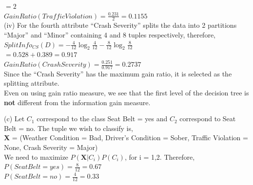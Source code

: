 \documentclass[10pt]{article}
\begin{document}
\begin{flushleft}
\hspace{9.6em} $ = 2$\\
\vspace{0.5em}
\hspace{2em} $GainRatio(Traffic Violation) = \frac{0.231}{2} = 0.1155$\\
\vspace{1em}
(iv) For the fourth attribute ``Crash Severity'' splits the data into 2 partitions ``Major'' and ``Minor'' containing 4 and 8 tuples respectively, therefore, \\
\vspace{0.5em}
\hspace{2em} $SplitInfo_{CS}(D) = - \frac{4}{12} \log_2 \frac{4}{12} - \frac{8}{12} \log_2 \frac{8}{12}$\\
\vspace{0.5em}
\hspace{9.6em} $ = 0.528 + 0.389 = 0.917$\\
\vspace{0.5em}
\hspace{2em} $GainRatio(Crash Severity) = \frac{0.251}{0.917} = 0.2737$\\
\vspace{1em}
Since the ``Crash Severity'' has the maximum gain ratio, it is selected as the splitting attribute.\\
\vspace{0.5em}
Even on using gain ratio measure, we see that the first level of the decision tree is \textbf{not} different from the information gain measure.\\
\end{flushleft}
\vspace{0.5em}
(c) Let $C_{1}$ correspond to the class Seat Belt = yes and $C_{2}$ correspond to Seat Belt = no. The tuple we wish to classify is,\\
\textbf{X} = (Weather Condition = Bad, Driver's Condition = Sober, Traffic Violation = None, Crash Severity = Major)\\
\vspace{0.5em}
We need to maximize $P( \textbf{X} | C_{i}) P(C_{i})$, for i = 1,2. Therefore, \\
\vspace{0.5em}
\hspace{2em} $P( Seat Belt = yes) = \frac{8}{12} = 0.67$\\
\vspace{0.5em}
\hspace{2em} $P( Seat Belt = no) = \frac{4}{12} = 0.33$\\
\end{document}

